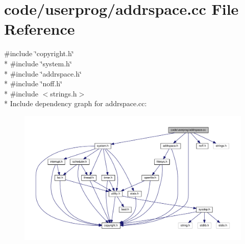 \section{code/userprog/addrspace.cc File Reference}
\label{addrspace_8cc}
{\ttfamily \#include \char`\"{}copyright.\+h\char`\"{}}\\*
{\ttfamily \#include \char`\"{}system.\+h\char`\"{}}\\*
{\ttfamily \#include \char`\"{}addrspace.\+h\char`\"{}}\\*
{\ttfamily \#include \char`\"{}noff.\+h\char`\"{}}\\*
{\ttfamily \#include $<$strings.\+h$>$}\\*
Include dependency graph for addrspace.\+cc\+:
\nopagebreak
\begin{figure}[H]
\begin{center}
\leavevmode
\includegraphics[width=350pt]{addrspace_8cc__incl}
\end{center}
\end{figure}

